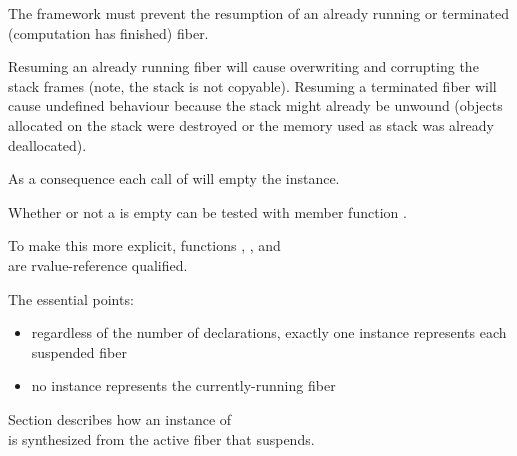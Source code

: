 \label{invalidation}

The framework must prevent the resumption of an already running or terminated
(computation has finished) fiber.

Resuming an already running fiber will cause overwriting and corrupting the stack
frames (note, the stack is not copyable).  Resuming a terminated fiber will
cause undefined behaviour because the stack might already be unwound (objects
allocated on the stack were destroyed or the memory used as stack was already
deallocated).

As a consequence each call of \resume will empty the \fiber instance.

Whether or not a \fiber is empty can be tested with member function \opbool.

To make this more explicit, functions \resume, \resumewith, \xtresume
and\\
\xtresumewith are rvalue-reference qualified.

The essential points:
\begin{itemize}
    \item regardless of the number of \fiber declarations, exactly one \fiber
          instance represents each suspended fiber
    \item no \fiber instance represents the currently-running fiber
\end{itemize}

Section  describes how an instance of\\
\fiber is synthesized from the active fiber that suspends.

